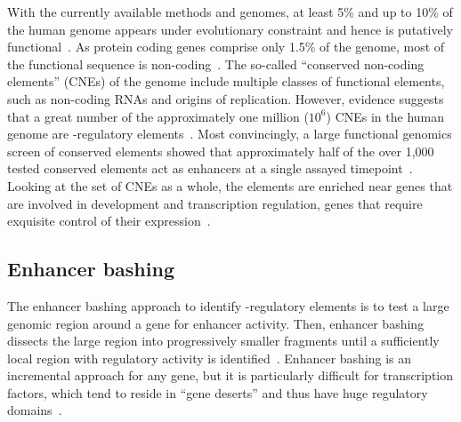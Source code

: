 With the currently available methods and genomes, at least 5\% and up to 10\% of the human genome appears under
evolutionary constraint and hence is putatively functional~\citep{Garber2009,Waterston2002}.  As protein coding genes
comprise only 1.5\% of the genome, most of the functional sequence is non-coding~\citep{Hsu2006}.  The so-called
``conserved non-coding elements'' (CNEs) of the genome
include multiple classes of functional elements, such as non-coding RNAs and origins of replication.  However,
evidence suggests that a great number of the approximately one million (\begin{math}10^{6}\end{math}) CNEs in the human
genome are \cis-regulatory elements~\citep{Bejerano2004,Encode2011}.  Most convincingly, a large functional genomics
screen of conserved elements showed that approximately half of the over 1,000 tested conserved elements act as enhancers
at a single assayed timepoint~\citep{Pennacchio2006}.  Looking at the set of CNEs
as a whole, the elements are enriched near genes that are involved in development and transcription regulation, genes that
require exquisite control of their expression~\citep{Bejerano2004}.
%

\subsection{Enhancer bashing}
The enhancer bashing approach to identify \cis-regulatory elements is to test a large genomic region around a gene
for enhancer activity.  Then, enhancer bashing dissects the large region
into progressively smaller fragments until a sufficiently local region
with regulatory activity is identified~\citep{Luo2008}.  Enhancer bashing is an incremental approach for any gene, but
it is particularly difficult for transcription factors, which tend to reside in ``gene deserts'' and thus have huge
regulatory domains~\citep{McLean2010, Ovcharenko2005}.
%


